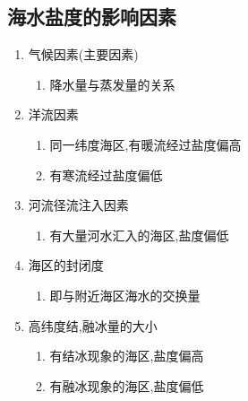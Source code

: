 \documentclass[a4paper]{article}
\begin{document}
    \subsection{海水盐度的影响因素}
    \begin{enumerate}
        \item 气候因素(主要因素)
        \begin{enumerate}
            \item 降水量与蒸发量的关系
        \end{enumerate}
        \item 洋流因素
        \begin{enumerate}
            \item 同一纬度海区,有暖流经过盐度偏高
            \item 有寒流经过盐度偏低
        \end{enumerate}
        \item 河流径流注入因素
        \begin{enumerate}
            \item 有大量河水汇入的海区,盐度偏低
        \end{enumerate}
        \item 海区的封闭度
        \begin{enumerate}
            \item 即与附近海区海水的交换量
        \end{enumerate}
        \item 高纬度结,融冰量的大小
        \begin{enumerate}
            \item 有结冰现象的海区,盐度偏高
            \item 有融冰现象的海区,盐度偏低
        \end{enumerate}
    \end{enumerate}
\end{document}
